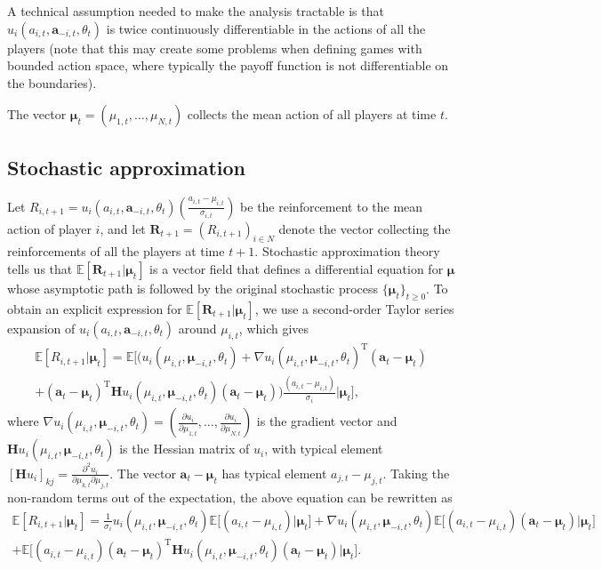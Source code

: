 \documentclass[11pt,reqno]{amsart}
\newcommand{\e}{\theta}
\newcommand{\ac}{a}
\newcommand{\va}{\mathbf{a}}
\newcommand{\Esp}{\mathds{E}}
\newcommand{\np}{N}%
\newcommand{\tm}{t}%
\newcommand{\pf}{u}
\newcommand{\ma}{\mu}
\newcommand{\sd}{\sigma}
\newcommand{\vma}{\boldsymbol{\ma}}
\newcommand{\rf}{R}
\newcommand{\vrf}{\mathbf{\rf}}
\newcommand{\pd}{\partial}
\newcommand{\Hs}{\mathbf{H}}
\begin{document}
A technical assumption needed to make the analysis tractable is that $\pf_{i}(\ac_{i,\tm},\va_{-i,\tm},\e_\tm)$ is twice continuously differentiable in the actions of all the players (note that this may create some problems when defining games with bounded action space, where typically the payoff function is not differentiable on the boundaries).

The vector $\vma_\tm = (\ma_{1,\tm},\dots,\ma_{\np,\tm})$ collects the mean action of all players at time $\tm$.


\subsection{Stochastic approximation}

Let $\rf_{i,t+1} = \pf_{i}(\ac_{i,\tm},\va_{-i,\tm},\e_\tm) \left( \frac{\ac_{i,\tm}- \ma_{i,\tm}}{\sd_{i,\tm}} \right)$ be the reinforcement to the mean action of player $i$, and let $\vrf_{\tm+1} = (\rf_{i,\tm+1})_{i\in\np}$ denote the vector collecting the reinforcements of all the players at time $\tm+1$. Stochastic approximation theory tells us that $\Esp[\vrf_{t+1} | \vma_\tm]$ is a vector field that defines a differential equation for $\vma$ whose asymptotic path is followed by the original stochastic process $\{ \vma_\tm \}_{t\geq 0}$. To obtain an explicit expression for $\Esp[\vrf_{t+1} | \vma_\tm]$, we use a second-order Taylor series expansion of $\pf_{i}(\ac_{i,\tm},\va_{-i,\tm},\e_\tm)$ around $\ma_{i,\tm}$, which gives
\begin{multline}
\label{RfExp}
\Esp[\rf_{i,t+1} | \vma_\tm] =  \Esp \Big[ \Big(\pf_{i}(\ma_{i,\tm},\vma_{-i,\tm},\e_\tm) + \nabla \pf_{i}(\ma_{i,\tm},\vma_{-i,\tm},\e_\tm)^{\textrm{T}} (\va_\tm  - \vma_\tm) \\
 + (\va_\tm  - \vma_\tm)^{\textrm{T}} \Hs \pf_{i}(\ma_{i,\tm},\vma_{-i,\tm},\e_\tm) (\va_\tm  - \vma_\tm) \Big) \frac{(\ac_{i,\tm}- \ma_{i,\tm})}{\sd_{i}} \Big| \vma_\tm \Big],
\end{multline}
where $\nabla \pf_{i}(\ma_{i,\tm},\vma_{-i,\tm},\e_\tm) = \left(\frac{\pd \pf_{i}}{\pd \ma_{1,\tm}},\dots,\frac{\pd \pf_{i}}{\pd \ma_{\np,\tm}}\right)$ is the gradient vector and $\Hs \pf_{i}(\ma_{i,\tm},\vma_{-i,\tm},\e_\tm)$ is the Hessian matrix of $\pf_{i}$, with typical element $[\Hs \pf_{i}]_{kj} = \frac{\pd^2 \pf_{i}}{\pd \ma_{k,\tm} \pd \ma_{j,\tm}}$. The vector $\va_\tm  - \vma_\tm$ has typical element $\ac_{j,\tm}- \ma_{j,\tm}$. Taking the non-random terms out of the expectation, the above equation can be rewritten as
\begin{multline}
\label{RfExp2}
\Esp[\rf_{i,t+1} | \vma_\tm] = \frac{1}{\sd_{i}} \pf_{i}(\ma_{i,\tm},\vma_{-i,\tm},\e_\tm) \Esp \Big[ (\ac_{i,\tm}- \ma_{i,\tm}) \Big| \vma_\tm \Big] + \nabla \pf_{i}(\ma_{i,\tm},\vma_{-i,\tm},\e_\tm) \Esp \Big[ (\ac_{i,\tm}- \ma_{i,\tm}) (\va_\tm  - \vma_\tm) \Big| \vma_\tm \Big] \\
+ \Esp \Big[ (\ac_{i,\tm}- \ma_{i,\tm}) (\va_\tm  - \vma_\tm)^{\textrm{T}} \Hs \pf_{i}(\ma_{i,\tm},\vma_{-i,\tm},\e_\tm) (\va_\tm  - \vma_\tm) \Big| \vma_\tm \Big].
\end{multline}
\end{document}
